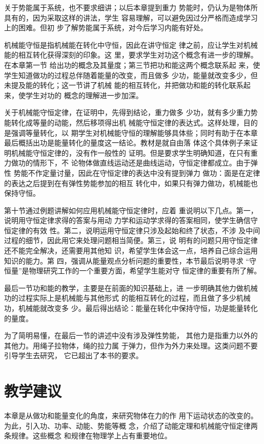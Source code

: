 关于势能属于系统，也不要求细讲；以后本章提到重力
势能时，仍认为是物体所具有的，因为采取这样的讲法，学生
容易理解，可以避免因过分严格而造成学习上的困难。但初
步了解势能属于系统，对今后学习内能有好处。

机械能守恒是指机械能在转化中守恒，因此在讲守恒定
律之前，应让学生对机械能的相互转化获得深刻的印象。这
里，要求学生对功这个概念有进一步的理解。在本章第一节
给出功的概念及其量度；第三节把功和能这两个概念联系起
来，使学生知道做功的过程总伴随着能量的改变，而且做多
少功，能量就改变多少，但未提及能的转化；这一节讲了机械
能的相互转化，并把做功和能的转化联系起来，使学生对功的
概念的理解进一步加深。

关于机械能守恒定律，在证明中，先得到结论，重力做多
少功，就有多少重力势能转化成等量的动能，然后移项得出机
械能守恒定律的表达式。这样处理，目的是强调等量转化，以
期学生对机械能守恒的理解能够具体些；同时有助于在本章
最后概括出功是能量转化的量度这一结论。教材是就自由落
体这个具体例子来证明机械能守恒定律的，没有作一般性的
证明。但是要求学生明确知道，在只有重力做功的情形下，不
论物体做直线运动还是曲线运动，守恒定律都成立。由于弹性
势能不作定量讨量，因此在守恒定律的表达中没有提到弹力
做功：面是在定律的表达之后提到在有弹性势能参加的相互
转化中，如果只有弹力做功，机械能也保持守恒。

第十节通过例题讲解如何应用机械能守恒定律时，应着
重说明以下几点。第一，说明用守恒定律求得的答案与用动
力学和运动学求得的答案相同，使学生确信守恒定律的有效
性。第二，说明运用守恒定律只涉及起始和终了状态，不涉
及中间过程的细节，因此用它来处理问题相当简便。第三，说
明有的问题只用守恒定律还不能完全解决，还需要用其他知
识，希望学生体会这一点，培养自己综合运用知识的能力。第
四，强调从能量观点分析问题的重要性，本节最后说明寻求
“守恒量”是物理研究工作的一个重要方面，希望学生能对守
恒定律的重要有所了解。

最后一节功和能的教学，主要是在前面的知识基础上，进
一步明确其他力做机械功的过程实际上是机械能与其他形式
的能相互转化的过程，而且做了多少机械功，机械能就改变多
少。最后得出结论：能量在转化中保持守恒，功是能量转化
的量度。

为了简明易懂，在最后一节的讲述中没有涉及弹性势能，
其他力是指重力以外的其他力。用绳子拉物体，绳的拉力属
于弹力，但作为外力来处理。这类问题不要引导学生去研究，
它已超出了本书的要求。

\section{教学建议}
本章是从做功和能量变化的角度，来研究物体在力的作
用下运动状态的改变的。为此，引入功、功率、动能、势能等概
念，介绍了动能定理和机械能守恒定律两条规律。这些概念
和规律在物理学上占有重要地位。

